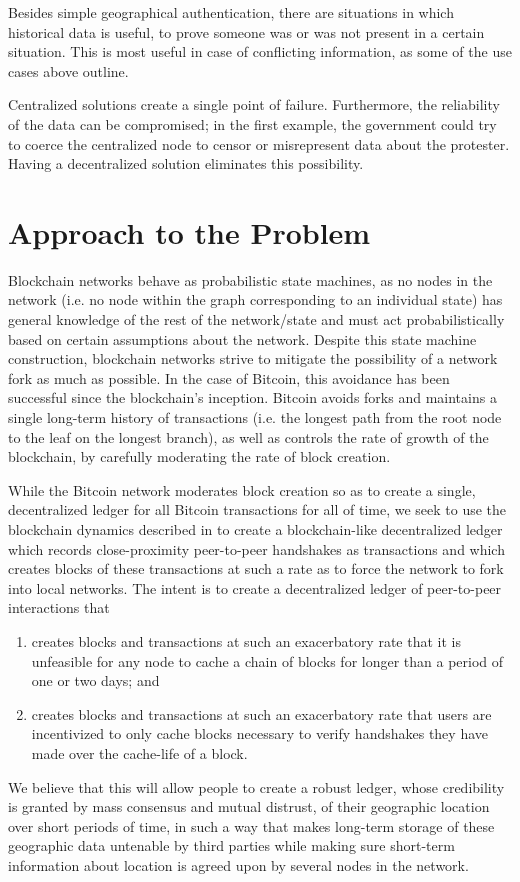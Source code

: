 \documentclass{article}
\begin{document}
Besides simple geographical authentication,
there are situations in which historical data is useful,
to prove someone was or was not present in a certain situation.
This is most useful in case of conflicting information,
as some of the use cases above outline.

Centralized solutions create a single point of failure.
Furthermore,
the reliability of the data can be compromised;
in the first example,
the government could try to coerce the centralized node
to censor or misrepresent data about the protester.
Having a decentralized solution eliminates this possibility.

\section*{Approach to the Problem}
Blockchain networks behave as probabilistic state machines, as no nodes in the
network (i.e. no node within the graph corresponding to an individual state) has
general knowledge of the rest of the network/state and must act probabilistically
based on certain assumptions about the network\cite{saito_2016}. Despite this
state machine construction, blockchain networks strive to mitigate the
possibility of a network fork as much as possible. In the case of Bitcoin, this
avoidance has been successful since the blockchain's inception\cite{decker_2013}.
Bitcoin avoids forks and maintains a single long-term history of transactions
(i.e. the longest path from the root node to the leaf on the longest branch), as
well as controls the rate of growth of the blockchain, by carefully moderating
the rate of block creation.

While the Bitcoin network moderates block creation so as to create a single,
decentralized ledger for all Bitcoin transactions for all of time, we seek to use
the blockchain dynamics described in \cite{decker_2013} to create a
blockchain-like decentralized ledger which records close-proximity peer-to-peer
handshakes as transactions and which creates blocks of these transactions at such
a rate as to force the network to fork into local networks. The intent is to
create a decentralized ledger of peer-to-peer interactions that
\begin{enumerate}
	\item creates blocks and transactions at such an exacerbatory rate that
		it is unfeasible for any node to cache a chain of blocks for
		longer than a period of one or two days; and
	\item creates blocks and transactions at such an exacerbatory rate that
		users are incentivized to only cache blocks necessary to verify
		handshakes they have made over the cache-life of a block.
\end{enumerate}
We believe that this will allow people to create a robust ledger, whose
credibility is granted by mass consensus and mutual distrust, of their geographic location
over short periods of time, in such a way that makes long-term storage of these
geographic data untenable by third parties while making sure short-term
information about location is agreed upon by several nodes in the network.
\end{document}
